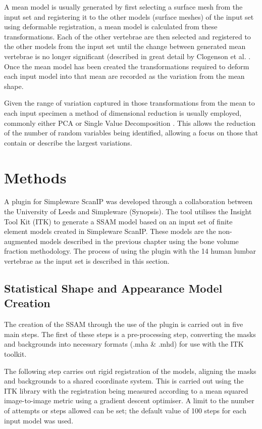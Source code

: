 A mean model is usually generated by first selecting a surface mesh from the
input set and registering it to the other models (surface meshes) of the input
set using deformable registration, a mean model is calculated from these
transformations. Each of the other vertebrae are then selected and registered
to the other models from the input set until the change between generated mean
vertebrae is no longer significant (described in great detail by Clogenson et
al. \cite{clogenson2015statistical}. Once the mean model has been created the
transformations required to deform each input model into that mean are recorded
as the variation from the mean shape.

Given the range of variation captured in those transformations from the mean to
each input specimen a method of dimensional reduction is usually employed,
commonly either PCA \cite{clogenson2015statistical} or Single Value
Decomposition \cite{chan20183}. This allows the reduction of the number of
random variables being identified, allowing a focus on those that contain or
describe the largest variations. 


\section{Methods}

A plugin for Simpleware ScanIP was developed through a collaboration between
the University of Leeds and Simpleware (Synopsis). The tool utilises the
Insight Tool Kit (ITK) to generate a SSAM model based on an input set of finite
element models created in Simpleware ScanIP. These models are the non-augmented
models described in the previous chapter using the bone volume fraction
methodology. The process of using the plugin with the 14 human lumbar vertebrae
as the input set is described in this section.

\subsection{Statistical Shape and Appearance Model Creation}

The creation of the SSAM through the use of the plugin is carried out in five main steps.
The first of these steps is a pre-processing step, converting the masks and
backgrounds into necessary formats (.mha \& .mhd) for use with the ITK
toolkit.

The following step carries out rigid registration of the models, aligning the
masks and backgrounds to a shared coordinate system.  This is carried out using
the ITK library with the registration being measured according to a mean
squared image-to-image metric using a gradient descent optimiser.  A limit to
the number of attempts or steps allowed can be set; the default value of 100
steps for each input model was used.

